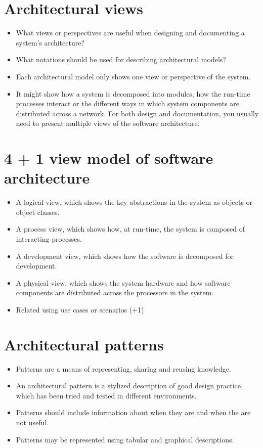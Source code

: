 \section{Architectural views}
\begin{itemize}
\item What views or perspectives are useful when designing and documenting a system’s architecture?

\item What notations should be used for describing architectural models?

\item Each architectural model only shows one view or perspective of the system.

 \item It might show how a system is decomposed into modules, how the run-time processes interact or the different ways in which system components are distributed across a network. For both design and documentation, you usually need to present multiple views of the software architecture.

\end{itemize}
\section{4 + 1 view model of software architecture}
\begin{itemize}
\item A logical view, which shows the key abstractions in the system as objects or object classes.

\item A process view, which shows how, at run-time, the system is composed of interacting processes.

\item A development view, which shows how the software is decomposed for development.

\item A physical view, which shows the system hardware and how software components are distributed across the processors in the system.

\item Related using use cases or scenarios (+1)
\end{itemize}
\section{Architectural patterns}
\begin{itemize}
\item Patterns are a means of representing, sharing and reusing knowledge.

\item An architectural pattern is a stylized description of good design practice, which has been tried and tested in different environments.

\item Patterns should include information about when they are and when the are not useful.

\item Patterns may be represented using tabular and graphical descriptions.

\end{itemize}

